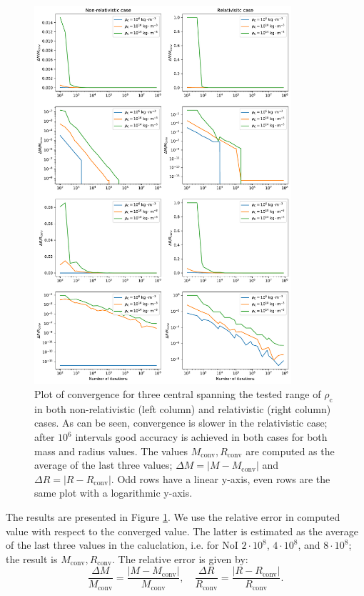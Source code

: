 \documentclass[]{article}
\newcommand{\rhoCentre}{\rho_\mathrm{c}}
\begin{document}
	\begin{figure}[htb]
		\centering
		\includegraphics[width=0.85\textwidth,keepaspectratio]{figures/convergencePlot.pdf}
		\caption{Plot of convergence for three central spanning the tested range of $\rhoCentre$ in both non-relativistic (left column) and relativistic (right column) cases. As can be seen, convergence is slower in the relativistic case; after $10^6$ intervals good accuracy is achieved in both cases for both mass and radius values. The values $M_\textrm{conv}, R_\textrm{conv}$ are computed as the average of the last three values; $\Delta M = \left| M - M_\mathrm{conv}\right|$ and $\Delta R = \left| R - R_\mathrm{conv}\right|$. Odd rows have a linear y-axis, even rows are the same plot with a logarithmic y-axis.\label{fig:convergence-results}}
	\end{figure}

	The results are presented in Figure \ref{fig:convergence-results}. We use the relative error in computed value with respect to the converged value. The latter is estimated as the average of the last three values in the caluclation, i.e. for NoI $2 \cdot 10^8$, $4 \cdot 10^8$, and $8 \cdot 10^8$; the result is $M_\textrm{conv}, R_\textrm{conv}$. The relative error is given by:
	\begin{equation}
		\frac{\Delta M}{M_\mathrm{conv}} = \frac{\left| M - M_\mathrm{conv}\right|}{M_\mathrm{conv}}, \quad \frac{\Delta R}{R_\mathrm{conv}} = \frac{\left| R - R_\mathrm{conv}\right|}{R_\mathrm{conv}}.
	\end{equation}
\end{document}
